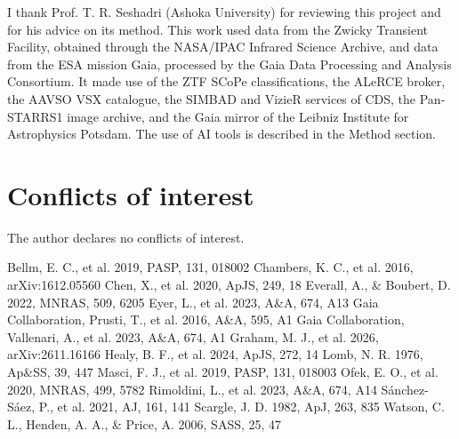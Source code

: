 \documentclass[twocolumn]{searchchev_preprint}
\begin{document}
\begin{acknowledgments}
I thank Prof. T. R. Seshadri (Ashoka University) for reviewing this project and for his advice on its method.
This work used data from the Zwicky Transient Facility, obtained through the NASA/IPAC Infrared Science Archive, and
data from the ESA mission Gaia, processed by the Gaia Data Processing and Analysis Consortium. It made use of the
ZTF SCoPe classifications, the ALeRCE broker, the AAVSO VSX catalogue, the SIMBAD and VizieR services of CDS, the
Pan-STARRS1 image archive, and the Gaia mirror of the Leibniz Institute for Astrophysics Potsdam. The use of AI tools is described in the Method section.
\end{acknowledgments}

\section*{Conflicts of interest}
The author declares no conflicts of interest.

\begin{thebibliography}{}
 Bellm, E. C., et al. 2019, PASP, 131, 018002
 Chambers, K. C., et al. 2016, arXiv:1612.05560
 Chen, X., et al. 2020, ApJS, 249, 18
 Everall, A., \& Boubert, D. 2022, MNRAS, 509, 6205
 Eyer, L., et al. 2023, A\&A, 674, A13
 Gaia Collaboration, Prusti, T., et al. 2016, A\&A, 595, A1
 Gaia Collaboration, Vallenari, A., et al. 2023, A\&A, 674, A1
 Graham, M. J., et al. 2026, arXiv:2611.16166
 Healy, B. F., et al. 2024, ApJS, 272, 14
 Lomb, N. R. 1976, Ap\&SS, 39, 447
 Masci, F. J., et al. 2019, PASP, 131, 018003
 Ofek, E. O., et al. 2020, MNRAS, 499, 5782
 Rimoldini, L., et al. 2023, A\&A, 674, A14
 S\'anchez-S\'aez, P., et al. 2021, AJ, 161, 141
 Scargle, J. D. 1982, ApJ, 263, 835
 Watson, C. L., Henden, A. A., \& Price, A. 2006, SASS, 25, 47
\end{thebibliography}
\end{document}
